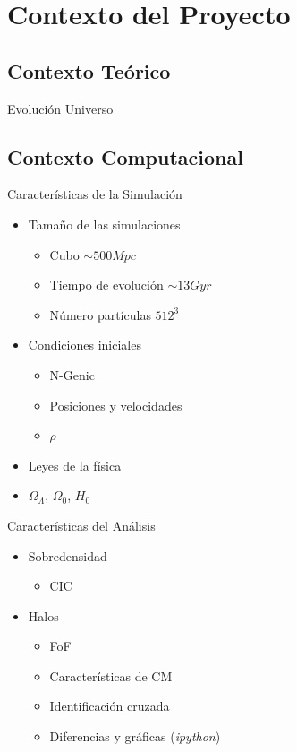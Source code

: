 \documentclass{beamer}
\begin{document}
\section{Contexto del Proyecto}
\subsection{Contexto Teórico}
\begin{frame}{Evolución Universo}


\end{frame}

\subsection{Contexto Computacional}
\begin{frame}{Características de la Simulación}
	\begin{itemize}
		\item Tamaño de las simulaciones
		\begin{itemize}
			\item Cubo $\sim 500Mpc$
			\item Tiempo de evolución $\sim 13 Gyr$
			\item Número partículas $512^3$
		\end{itemize}
		\item Condiciones iniciales
		\begin{itemize}
			\item N-Genic
			\item Posiciones y velocidades
			\item $\rho$
		\end{itemize}
		\item Leyes de la física
		\item $\Omega_\Lambda$, $\Omega_0$, $H_0$
	\end{itemize}
		
\end{frame}
\begin{frame}{Características del Análisis}
	\begin{block}{}
	\begin{itemize}
		\item Sobredensidad
		\begin{itemize}
			\item CIC
		\end{itemize}
		\item Halos
		\begin{itemize}
			\item FoF
			\item Características de CM
			\item Identificación cruzada
			\item Diferencias y gráficas (\textit{ipython})
		\end{itemize}
	\end{itemize}
	\end{block}	
\end{frame}
\end{document}
